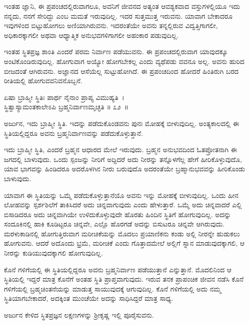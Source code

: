 ಇಂತಹ ಜ್ಞಾನಿ, ಈ ಪ್ರಪಂಚದಲ್ಲಿರುವಾಗಲೂ, ಅವನಿಗೆ ಜೀವನದ ಅತ್ಯಂತ ಆವಶ್ಯಕವಾದ ವಸ್ತುಗಳಲ್ಲಿಯೂ ಇದು ನನ್ನದು, ನನಗೆ ಸೇರಿದ್ದು ಎಂಬ ಮಮತೆ ಇರುವುದಿಲ್ಲ. ಇದರ ಸುತ್ತಮುತ್ತ ಇರುವನು. ಯಾವಾಗ ಬೇಕಾದರೂ ಇವುಗಳಿಂದ ಬಿಟ್ಟುಹೋಗಲು ಅಣಿಯಾಗಿರುವನು. ಇದರಂತೆಯೇ ಅವನು ತನ್ನಲ್ಲಿರುವ ವಿದ್ವತ್ತಿಗಾಗಲೀ, ಅಧಿಕಾರಕ್ಕಾಗಲೀ ಅಥವಾ ಆಧ್ಯಾತ್ಮಿಕ ಅನುಭವಗಳಿಗಾಗಲೀ ಅಹಂಕಾರ ಪಡುವುದಿಲ್ಲ.

ಇಂತಹ ಸ್ಥಿತಪ್ರಜ್ಞ ಶಾಂತಿ ಎಂದರೆ ಪರಮ ನಿರ್ವಾಣ ಪಡೆಯುವನು. ಈ ಪ್ರಪಂಚದಲ್ಲಿರುವಾಗ ಯಾವುದಕ್ಕೂ ಅಂಟಿಕೊಂಡಿರುವುದಿಲ್ಲ. ಹೋಗುವಾಗ ಅಯ್ಯೋ ಹೋಗಬೇಕಲ್ಲ ಎಂದು ವ್ಯಥೆಪಡು ವವನೂ ಅಲ್ಲ. ಅವನು ಹುರಿದ ಬೀಜದಂತೆ ಆಗಿರುವನು. ಅಜ್ಞಾನದ ಆಸೆಯೆಲ್ಲ ಸುಟ್ಟುಹೋಗಿದೆ. ಈ ಪ್ರಪಂಚದಿಂದ ಹೋದರೆ ಹಿಂತಿರುಗಿ ಬರದ ರೀತಿಯಲ್ಲಿ ಹೋಗುವವನಿವನೊಬ್ಬನೆ.

\begin{shloka}
ಏಷಾ ಬ್ರಾಹ್ಮೀ ಸ್ಥಿತಿಃ ಪಾರ್ಥ ನೈನಾಂ ಪ್ರಾಪ್ಯ ವಿಮುಹ್ಯತಿ~।\\ಸ್ಥಿತ್ವಾಸ್ಯಾಮಂತಕಾಲೇಽಪಿ ಬ್ರಹ್ಮನಿರ್ವಾಣಮೃಚ್ಛತಿ \hfill॥ ೭೨~॥
\end{shloka}

\begin{artha}
ಅರ್ಜುನ, ಇದು ಬ್ರಾಹ್ಮೀ ಸ್ಥಿತಿ. ಇದನ್ನು ಪಡೆದುಕೊಂಡವನು ಪುನಃ ಮೋಹಕ್ಕೆ ಬೀಳುವುದಿಲ್ಲ. ಅಂತ್ಯಕಾಲದಲ್ಲಿ ಈ ಸ್ಥಿತಿಯಲ್ಲಿದ್ದರೂ ಅವನು ಬ್ರಹ್ಮನಿರ್ವಾಣವನ್ನು ಪಡೆದುಕೊಳ್ಳುತ್ತಾನೆ.
\end{artha}

ಇದು ಬ್ರಾಹ್ಮೀ ಸ್ಥಿತಿ, ಎಂದರೆ ಬ್ರಹ್ಮನ ಆಧಾರದ ಮೇಲೆ ಇರುವುದು. ಬ್ರಹ್ಮನ ಅನುಭವದಿಂದ ಓತಪ್ರೋತನಾಗಿ ಈ ಜಗದಲ್ಲಿ ಬಾಳುವುದು. ಒಂದು ಸ್ಪಂಜನ್ನು ನೀರಿಗೆ ಅದ್ದಿದರೆ ಅದು ನೀರನ್ನು ತನ್ನೊಳಗೆಲ್ಲ ಹೇಗೆ ಹೀರಿಕೊಳ್ಳುವುದೊ, ಯಾವ ಭಾಗವನ್ನು ಹಿಂಡಿದರೂ ಅದರೊಳಗಿನ ನೀರು ಬರುವುದೊ ಅದರಂತೆಯೇ ಬ್ರಹ್ಮಾನುಭವವನ್ನು ಹೀರಿಕೊಂಡು ಬಾಳುವುದು.

ಯಾವಾಗ ಈ ಸ್ಥಿತಿಯನ್ನು ಒಮ್ಮೆ ಪಡೆದುಕೊಳ್ಳುತ್ತಾನೆಯೊ ಅವನು ಇನ್ನು ಮೋಹಕ್ಕೆ ಬೀಳುವುದಿಲ್ಲ. ಒಂದು ಹೀನ ಲೋಹವನ್ನು ಸ್ಪರ್ಶಶಿಲೆಗೆ ತಾಕಿಸಿದರೆ ಅದು ಚಿನ್ನವಾಗುವುದು ಎಂದು ಹೇಳುತ್ತಾರೆ. ಒಮ್ಮೆ ಅದು ಚಿನ್ನವಾದರೆ ಎಲ್ಲಿ ಬಿಸಾಡಿದರೂ ಅದು ಚಿನ್ನವಾಗಿಯೇ ಉಳಿದುಕೊಳ್ಳುವುದೇ ಹೊರತು ಹಿಂದಿನ ಸ್ಥಿತಿಗೆ ಹೋಗುವುದಿಲ್ಲ. ಅದನ್ನು ಸಂದೂಕಿನಲ್ಲಿ ಹಾಕಿ ಕೂಡಿಟ್ಟರೂ ಚಿನ್ನವೇ, ಎಲ್ಲೊ ಹೊರಗಡೆ ಅದನ್ನು ಬಿಸುಟರೂ ಚಿನ್ನವೇ ಆಗಿರುವುದು. ಮರಳುಕಾಡಿನಲ್ಲಿ ಹೋಗುತ್ತಿರುವಾಗ ಮರೀಚಿಕೆಯನ್ನು ಮೊದಲು ಪ್ರಯಾಣಿಕನು ಕಂಡು ಅಲ್ಲಿ ನೀರನ್ನೇ ಹುಡುಕಲು ಹೋಗುವನು. ಆದರೆ ಅದೊಂದು ಭ್ರಮೆ, ಮರೀಚಿಕೆ ಎಂದು ಗೊತ್ತಾದಮೇಲೆ ಅಲ್ಲಿಗೆ ಸ್ನಾನ ಮಾಡುವುದಕ್ಕಾಗಲಿ, ಆ ನೀರನ್ನು ಕುಡಿಯುವುದಕ್ಕಾಗಲಿ ಹೋಗುವುದಿಲ್ಲ.

ಕೊನೆ ಗಳಿಗೆಯಲ್ಲಿ ಈ ಸ್ಥಿತಿಯಲ್ಲಿದ್ದರೂ ಅವನು ಬ್ರಹ್ಮನಿರ್ವಾಣ ಪಡೆಯುತ್ತಾನೆ ಎನ್ನುತ್ತಾನೆ. ಮೊದಲಿನಿಂದ ಆ ಸ್ಥಿತಿಯಲ್ಲಿ ಇದ್ದರೆ ಮಾತ್ರ ಕೊನೆಗೆ ಅಂತಹ ಸ್ಥಿತಿ ಪ್ರಾಪ್ತವಾಗುವುದು. ಇರುವ ತನಕ ಪ್ರಾಪಂಚಿಕ ಜೀವನ ನಡೆಸಿ ಕೊನೆ ಗಳಿಗೆಯಲ್ಲಿ ಬ್ರಹ್ಮಚಿಂತನೆಯನ್ನು ಮಾಡುತ್ತ ಸಾಯುವುದಕ್ಕೆ ಆಗುವುದಿಲ್ಲ. ಕೊನೆ ಗಳಿಗೆಯಲ್ಲಿ ಅದು ನಮ್ಮ ಸ್ಥಿತಿಯಾಗಬೇಕಾದರೆ, ಅದಕ್ಕಿಂತ ಮುಂಚೆಯೇ ಅದನ್ನು ಸಾಧಿಸಿದ್ದರೆ ಮಾತ್ರ ಸಾಧ್ಯ.

ಅರ್ಜುನ ಕೇಳಿದ ಸ್ಥಿತಪ್ರಜ್ಞನ ಲಕ್ಷಣಗಳನ್ನು ಶ‍್ರೀಕೃಷ್ಣ ಇಲ್ಲಿ ಪೂರೈಸುವನು.

